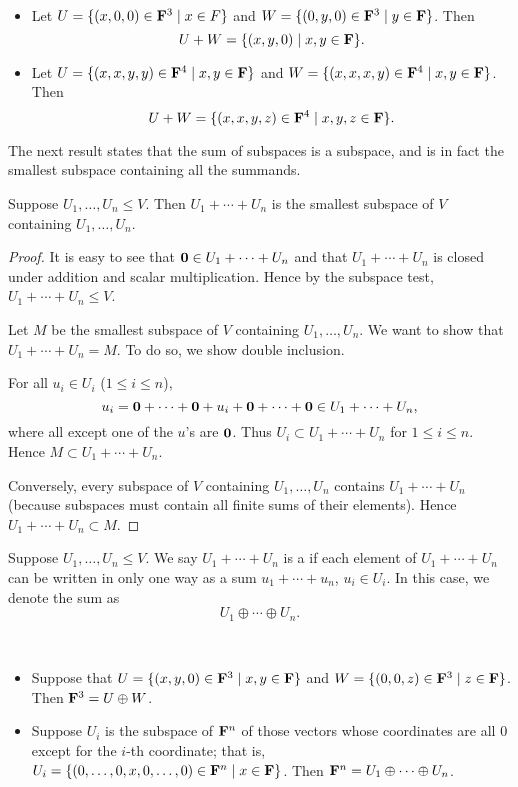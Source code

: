 \begin{example} \
\begin{itemize}
\item Let $U=\{(x,0,0)\in\mathbf F^3\mid x\in F\}$ and $W=\{(0,y,0)\in\mathbf F^3\mid y\in\mathbf F\}$. Then
\[U+W=\{(x,y,0)\mid x,y\in\mathbf F\}.\]
\item Let $U=\{(x,x,y,y)\in\mathbf F^4\mid x,y\in\mathbf F\}$ and $W=\{(x,x,x,y)\in\mathbf F^4\mid x,y\in\mathbf F\}$. Then
\[U+W=\{(x,x,y,z)\in\mathbf F^4\mid x,y,z\in\mathbf F\}.\]
\end{itemize}
\end{example}

The next result states that the sum of subspaces is a subspace, and is in fact the smallest subspace containing all the summands.

\begin{proposition}
Suppose $U_1,\dots,U_n\le V$. Then $U_1+\cdots+U_n$ is the smallest subspace of $V$ containing $U_1,\dots,U_n$.
\end{proposition}

\begin{proof}
It is easy to see that $\vb{0}\in U_1+\cdots+U_n$ and that $U_1+\cdots+U_n$ is closed under addition and scalar multiplication. Hence by the subspace test, $U_1+\cdots+U_n\le V$.

Let $M$ be the smallest subspace of $V$ containing $U_1,\dots,U_n$. We want to show that $U_1+\cdots+U_n=M$. To do so, we show double inclusion.

\fbox{$\supset$} For all $u_i\in U_i$ ($1\le i\le n$),
\[u_i=\vb{0}+\cdots+\vb{0}+u_i+\vb{0}+\cdots+\vb{0}\in U_1+\cdots+U_n,\]
where all except one of the $u$'s are $\vb{0}$. Thus $U_i\subset U_1+\cdots+U_n$ for $1\le i\le n$. Hence $M\subset U_1+\cdots+U_n$.

\fbox{$\subset$} Conversely, every subspace of $V$ containing $U_1,\dots,U_n$ contains $U_1+\cdots+U_n$ (because subspaces must contain all finite sums of their elements). Hence $U_1+\cdots+U_n\subset M$.
\end{proof}

\begin{definition}
Suppose $U_1,\dots,U_n\le V$. We say $U_1+\cdots+U_n$ is a  if each element of $U_1+\cdots+U_n$ can be written in only one way as a sum $u_1+\cdots+u_n$, $u_i\in U_i$. In this case, we denote the sum as
\[U_1\oplus\cdots\oplus U_n.\]
\end{definition}

\begin{example} \
\begin{itemize}
\item Suppose that $U=\{(x,y,0)\in\mathbf F^3\mid x,y\in\mathbf F\}$ and $W=\{(0,0,z)\in\mathbf F^3\mid z\in\mathbf F\}$. Then $\mathbf F^3=U\oplus W$.

\item Suppose $U_i$ is the subspace of $\mathbf F^n$ of those vectors whose coordinates are all 0 except for the $i$-th coordinate; that is, $U_i=\{(0,\dots,0,x,0,\dots,0)\in\mathbf F^n\mid x\in\mathbf F\}$. Then $\mathbf F^n=U_1\oplus\cdots\oplus U_n$.
\end{itemize}
\end{example}

